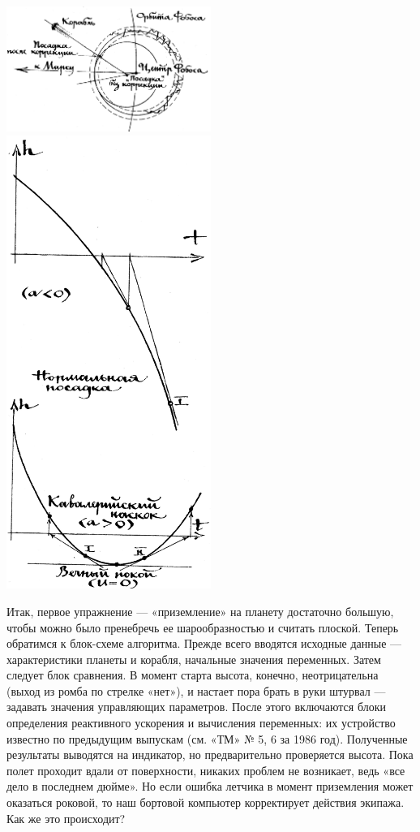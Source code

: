 \documentclass[11pt,a4paper,oneside]{article}
\begin{document}
\includegraphics[width=0.5\textwidth]{last_d2}
\includegraphics[width=0.5\textwidth]{last_d3}

Итак, первое упражнение — «приземление» на планету достаточно большую, чтобы можно было пренебречь ее шарообразностью и считать плоской. Теперь обратимся к блок-схеме алгоритма. Прежде всего вводятся исходные данные — характеристики планеты и корабля, начальные значения переменных. Затем следует блок сравнения. В момент старта высота, конечно, неотрицательна (выход из ромба по стрелке «нет»), и настает пора брать в руки штурвал — задавать значения управляющих параметров. После этого включаются блоки определения реактивного ускорения и вычисления переменных: их устройство известно по предыдущим выпускам (см. «ТМ» № 5, 6 за 1986 год). Полученные результаты выводятся на индикатор, но предварительно проверяется высота. Пока полет проходит вдали от поверхности, никаких проблем не возникает, ведь «все дело в последнем дюйме». Но если ошибка летчика в момент приземления может оказаться роковой, то наш бортовой компьютер корректирует действия экипажа. Как же это происходит?
\end{document}
